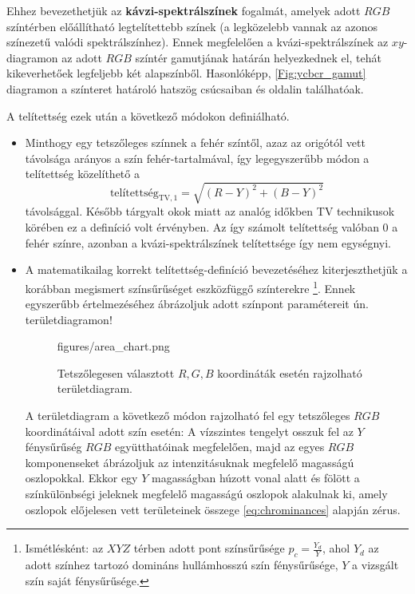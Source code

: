 Ehhez bevezethetjük az \textbf{kávzi-spektrálszínek} fogalmát, amelyek adott $RGB$ színtérben előállítható legtelítettebb színek (a legközelebb vannak az azonos színezetű valódi spektrálszínhez).
Ennek megfelelően a kvázi-spektrálszínek az $xy$-diagramon az adott $RGB$ színtér gamutjának határán helyezkednek el, tehát kikeverhetőek legfeljebb két alapszínből.
Hasonlóképp, \ref{Fig:ycbcr_gamut} diagramon a színteret határoló hatszög csúcsaiban és oldalin találhatóak.

A telítettség ezek után a következő módokon definiálható.
\begin{itemize}
\item  Minthogy egy tetszőleges színnek a fehér színtől, azaz az origótól vett távolsága arányos a szín fehér-tartalmával, így legegyszerűbb módon a telítettség közelíthető a
\begin{equation}
\text{telítettség}_{\mathrm{TV},1} = \sqrt{ (R-Y)^2 +(B-Y)^2}
\label{eq:saturation_1}
\end{equation}
távolsággal.
Később tárgyalt okok miatt az analóg időkben TV technikusok körében ez a definíció volt érvényben.
Az így számolt telítettség valóban $0$ a fehér színre, azonban a kvázi-spektrálszínek telítettsége így nem egységnyi.
%
\item A matematikailag korrekt telítettség-definíció bevezetéséhez kiterjeszthetjük a korábban megismert színsűrűséget eszközfüggő színterekre \footnote{Ismétlésként: az $XYZ$ térben adott pont színsűrűsége $p_c = \frac{Y_d}{Y}$, ahol $Y_d$ az adott színhez tartozó domináns hullámhosszú szín fénysűrűsége, $Y$ a vizsgált szín saját fénysűrűsége.}.
Ennek egyszerűbb értelmezéséhez ábrázoljuk adott színpont paramétereit ún. területdiagramon!
%
\begin{figure}[]
	\centering
	\begin{minipage}[c]{0.6\textwidth}
	\begin{overpic}[width = 1\columnwidth ]{figures/area_chart.png}
	\end{overpic} \end{minipage}\hfill
	\begin{minipage}[c]{0.4\textwidth}
	\caption{Tetszőlegesen választott $R,G,B$ koordináták esetén rajzolható területdiagram.}
	\label{Fig:area_diagram}  \end{minipage}
\end{figure}
%
A területdiagram a következő módon rajzolható fel egy tetszőleges $RGB$ koordinátáival adott szín esetén: 
A vízszintes tengelyt osszuk fel az $Y$ fénysűrűség $RGB$ együtthatóinak megfelelően, majd az egyes $RGB$ komponenseket ábrázoljuk az intenzitásuknak megfelelő magasságú oszlopokkal.
Ekkor egy $Y$ magasságban húzott vonal alatt és fölött a színkülönbségi jeleknek megfelelő magasságú oszlopok alakulnak ki, amely oszlopok előjelesen vett területeinek összege \eqref{eq:chrominances} alapján zérus.


\end{itemize}
